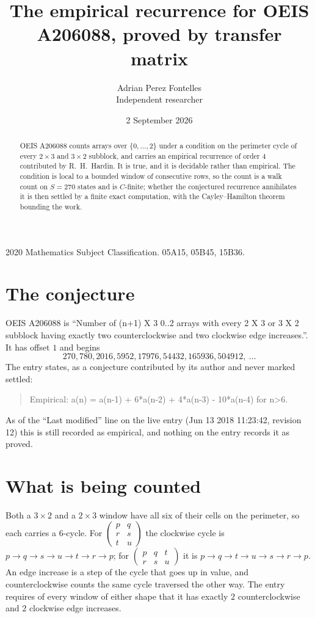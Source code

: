 \documentclass[11pt,a4paper]{article}
\title{The empirical recurrence for OEIS A206088, proved by transfer matrix}
\author{Adrian Perez Fontelles\\ \small Independent researcher}
\date{2 September 2026}
\theoremstyle{plain}
\theoremstyle{definition}
\begin{document}
\maketitle

\begin{abstract}
OEIS A206088 counts arrays over $\{0,\dots,2\}$ under a condition on the perimeter cycle of
every $2\times3$ and $3\times2$ subblock, and carries an empirical recurrence of order $4$ contributed by
R.~H.~Hardin. It is true, and it is decidable rather than empirical. The condition is local to
a bounded window of consecutive rows, so the count is a walk count on $S=270$ states and is
$C$-finite; whether the conjectured recurrence annihilates it is then settled by a finite exact
computation, with the Cayley--Hamilton theorem bounding the work.
\end{abstract}

\noindent\small 2020 Mathematics Subject Classification. 05A15, 05B45, 15B36.\normalsize

\section{The conjecture}

OEIS A206088 is ``Number of (n+1) X 3 0..2 arrays with every 2 X 3 or 3 X 2 subblock having exactly two counterclockwise and two clockwise edge increases.''. It has offset $1$ and begins
\[
270, 780, 2016, 5952, 17976, 54432, 165936, 504912,\ \dots
\]
The entry states, as a conjecture contributed by its author and never marked settled:
\begin{quote}
Empirical: a(n) = a(n-1) + 6*a(n-2) + 4*a(n-3) - 10*a(n-4) for n>6.
\end{quote}
As of the ``Last modified'' line on the live entry (Jun 13 2018 11:23:42, revision 12) this is still
recorded as empirical, and nothing on the entry records it as proved.

\section{What is being counted}

Both a $3\times2$ and a $2\times3$ window have all six of their cells on the
perimeter, so each carries a $6$-cycle. For
$\begin{pmatrix}p&q\\r&s\\t&u\end{pmatrix}$ the clockwise cycle is
$p\to q\to s\to u\to t\to r\to p$; for
$\begin{pmatrix}p&q&t\\r&s&u\end{pmatrix}$ it is
$p\to q\to t\to u\to s\to r\to p$. An edge increase is a step of the cycle that goes up in
value, and counterclockwise counts the same cycle traversed the other way. The entry requires
of every window of either shape that it has exactly $2$ counterclockwise and $2$ clockwise edge increases.
\end{document}
